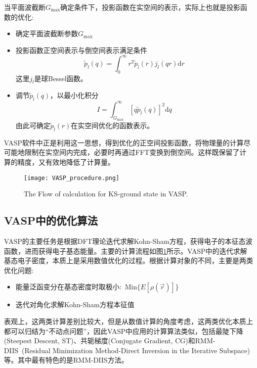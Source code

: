 \documentclass{article}      %
\newcommand{\upcite}[1]{\hspace{0ex}\textsuperscript{\cite{#1}}} %
\begin{document}
当平面波截断$G_{\mathrm{max}}$确定条件下，投影函数在实空间的表示，实际上也就是投影函数的优化:~
\begin{itemize}
	\item 确定平面波截断参数$G_{\mathrm{max}}$
	\item 投影函数正空间表示与倒空间表示满足条件
		\begin{equation}
			\tilde p_l(q)=\int_0^{\infty}r^2\tilde p_l(r)j_l(qr)\mathrm{d}r
			\label{eq:projector_G_R}
		\end{equation}
		这里$j_l$是球\textrm{Bessel}函数。
	\item 调节$\tilde p_l(q)$，以最小化积分
		\begin{equation}
			I=\int_{G_{\mathrm{max}}}^{\infty}[q\tilde p_l(q)]^2\mathrm{d}q
			\label{eq:projector_Int}
		\end{equation}
		由此可确定$\tilde p_l(r)$在实空间优化的函数表示。
\end{itemize}
\textrm{VASP}软件中正是利用这一思想，得到优化的正空间投影函数，将物理量的计算尽可能地限制在实空间内完成，必要时再通过\textrm{FFT}变换到倒空间。这样既保留了计算的精度，又有效地降低了计算量。

\begin{figure}[h!]
\centering
\texttt{[image: VASP\_procedure.png]}
\caption{\small \textrm{The Flow of calculation for KS-ground state in VASP.}}%
\label{PAW_procedure}
\end{figure}
\subsection{\rm{VASP}中的优化算法}
\textrm{VASP}的主要任务是根据\textrm{DFT}理论迭代求解\textrm{Kohn-Sham}方程，获得电子的本征态波函数，进而获得电子基态能量。主要的计算流程如图\ref{PAW_procedure}所示。\textrm{VASP}中的迭代求解基态电子密度，本质上是采用数值优化的过程。根据计算对象的不同，主要是两类优化问题:
\begin{itemize}
	\item 能量泛函变分在基态密度时取极小:~$\mathrm{Min}\{E[\rho(\vec r)]\}$
	\item 迭代对角化求解\textrm{Kohn-Sham}方程本征值
\end{itemize}
表观上，这两类计算差别比较大，但是从数值计算的角度考虑，这两类优化本质上都可以归结为“不动点问题”\upcite{Numerical-Analysis}，因此\textrm{VASP}中应用的计算算法类似，包括最陡下降\textrm{(Steepest Descent, ST)}、共轭梯度\textrm{(Conjugate Gradient, CG)}和\textrm{RMM-DIIS~(Residual Minimization Method-Direct Inversion in the Iterative Subspace)}等。其中最有特色的是\textrm{RMM-DIIS}方法。
\end{document}
